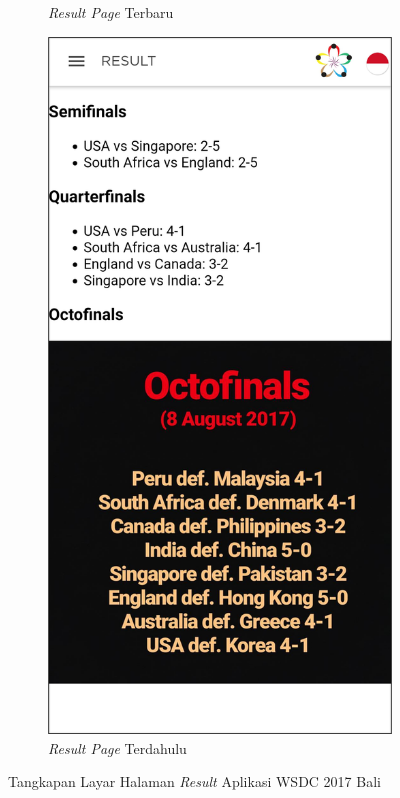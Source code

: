 \begin{figure}[H]
\begin{subfigure}[b]{0.3\textwidth}
         \caption{\textit{Result Page} Terbaru}
         \label{fig:ssResult}
     \end{subfigure}
     \hspace*{0.5in}
     \begin{subfigure}[b]{0.3\textwidth}
         \centering
         \includegraphics[width=\textwidth]{Gambar/ResultPage.png}
         \caption{\textit{Result Page} Terdahulu}
         \label{fig:ssResultOld}
     \end{subfigure}
        \caption{Tangkapan Layar Halaman \textit{Result} Aplikasi WSDC 2017 Bali}
        \label{fig:ssApk1}
\end{figure}


